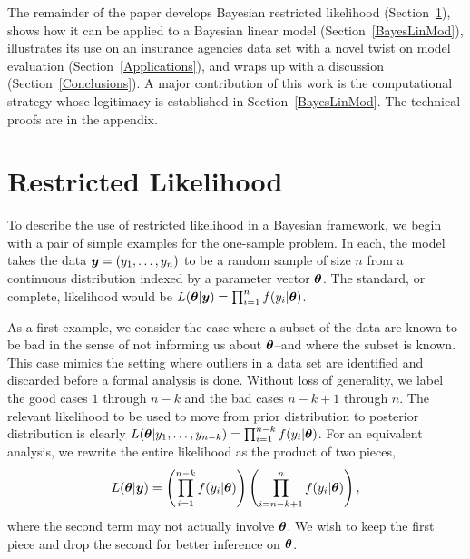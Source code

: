 \documentclass[12pt]{article}
\def\bth{\mbox{\boldmath $\theta$}}
\newcommand{\by}{\mbox{\boldmath $y$}}
\begin{document}
The remainder of the paper develops Bayesian restricted likelihood (Section~\ref{restrictedlikelihood}), shows
how it can be applied to a Bayesian linear model (Section~\ref{BayesLinMod}), illustrates its use
on an insurance agencies data set with a novel twist on model evaluation (Section~\ref{Applications}), 
and wraps up with a discussion (Section~\ref{Conclusions}).  
A major contribution of this work is the computational strategy whose legitimacy is established 
in Section~\ref{BayesLinMod}.  The technical proofs are in the appendix.   

\section{Restricted Likelihood}
\label{restrictedlikelihood}

To describe the use of restricted likelihood in a Bayesian framework, 
we begin with a pair of simple examples
for the one-sample problem.  In each, the model takes the
data $\by=(y_1,\ldots,y_n)$
to be a random sample
of size $n$ from a continuous distribution indexed by a parameter vector $\bth$.  The standard, or complete,
likelihood would be $L(\bth | \by) = \prod_{i=1}^n f(y_i | \bth)$.  

As a first example, we consider the case where a subset of the data are known to be 
bad in the sense of not
  informing us about $\bth$--and where the subset is known.  This case mimics the setting where outliers in
a data set are identified and discarded before a formal analysis is done.  
Without loss of generality, we label the good 
cases $1$ through $n-k$ and the bad 
cases $n-k+1$ through $n$.  
The relevant likelihood to be used to move from prior distribution to posterior distribution is clearly 
$L(\bth | y_1, \ldots, y_{n-k}) = \prod_{i=1}^{n-k} f(y_i | \bth)$.  
For an equivalent analysis, we rewrite the entire likelihood as the product of two pieces,
\begin{eqnarray}
\label{OutlyingCases}
L(\bth | \by)  
= \left( \prod_{i=1}^{n-k} f(y_i | \bth) \right) \left( \prod_{i=n-k+1}^{n} f(y_i | \bth) \right) ,
\end{eqnarray}
where the second term may not actually involve $\bth$.
We wish to keep the first piece and drop the second for better inference on $\bth$.
\end{document}
